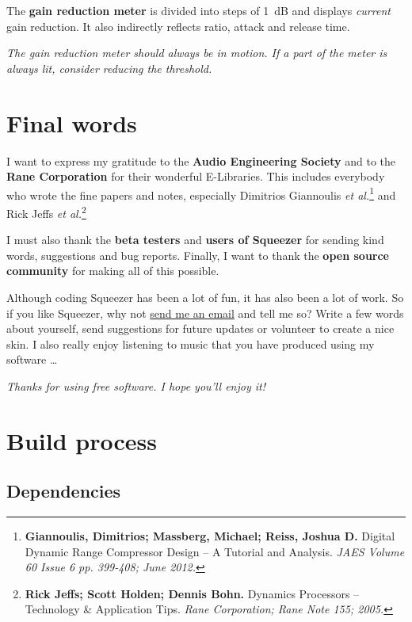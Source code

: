 The \textbf{gain reduction meter} is divided into steps of \SI{1}{\dB}
and displays \emph{current} gain reduction.  It also indirectly
reflects ratio, attack and release time.

\emph{The gain reduction meter should always be in motion.  If a part
  of the meter is always lit, consider reducing the threshold.}

\chapter{Final words}
\label{chap:final_words}

I want to express my gratitude to the \textbf{Audio Engineering
  Society} and to the \textbf{Rane Corporation} for their wonderful
E-Libraries.  This includes everybody who wrote the fine papers and
notes, especially Dimitrios Giannoulis \emph{et
  al.}\footnote{\textbf{Giannoulis, Dimitrios; Massberg, Michael;
    Reiss, Joshua D.}  Digital Dynamic Range Compressor Design -- A
  Tutorial and Analysis. \emph{JAES Volume 60 Issue 6 pp. 399-408;
    June 2012.}} and Rick Jeffs \emph{et al.}\footnote{\textbf{Rick
    Jeffs; Scott Holden; Dennis Bohn.}  Dynamics Processors --
  Technology \& Application Tips.  \emph{Rane Corporation; Rane Note
    155; 2005.}}

I must also thank the \textbf{beta testers} and \textbf{users of
  Squeezer} for sending kind words, suggestions and bug reports.
Finally, I want to thank the \textbf{open source community} for making
all of this possible.

Although coding Squeezer has been a lot of fun, it has also been a lot
of work.  So if you like Squeezer, why not
\href{http://www.mzuther.de/}{send me an email} and tell me so?  Write
a few words about yourself, send suggestions for future updates or
volunteer to create a nice skin.  I also really enjoy listening to
music that you have produced using my software \dots

\emph{Thanks for using free software.  I hope you'll enjoy it!}

\appendix

\chapter{Build process}
\label{chap:build_process}

\section{Dependencies}
\label{sec:dependencies}

